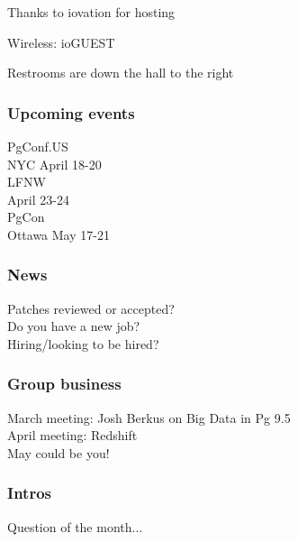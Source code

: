 \documentclass{beamer}
\begin{document}

\frame
{
  \begin{center}
  \item[]Thanks to iovation for hosting
  \item[]Wireless: ioGUEST
  \item[]Restrooms are down the hall to the right
  \end{center}
}


\frame
{
  \frametitle{Upcoming events}
  \begin{center}
{\large PgConf.US\\}
NYC April 18-20\\
\vspace{5mm}
{\large LFNW\\} April 23-24\\
\vspace{5mm}
{\large PgCon\\}
Ottawa May 17-21\\
  \end{center}
}

\frame
{
  \frametitle{News}
  \begin{center}
Patches reviewed or accepted?\\
Do you have a new job?\\
Hiring/looking to be hired?\\
  \end{center}
}

\frame
{
  \frametitle{Group business}
  \begin{center}
March meeting: Josh Berkus on Big Data in Pg 9.5\\
April meeting: Redshift\\
\vspace{5mm}
May could be you!
  \end{center}
}


\frame
{
  \frametitle{Intros}
  \begin{center}
Question of the month...\\
  \end{center}
}
\end{document}
